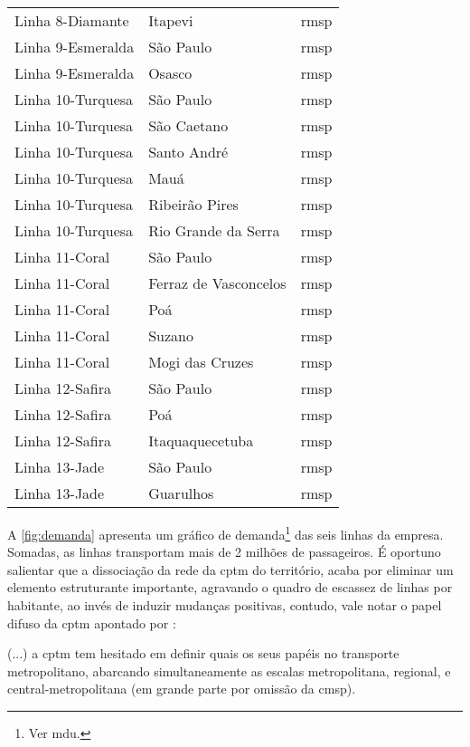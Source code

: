 \documentclass[11pt,fleqn]{book} %
\begin{document}
\begin{center}
\begin{longtable}{|l|l|l|}
		Linha 8-Diamante & Itapevi & \gls{rmsp} \\
		Linha 9-Esmeralda & São Paulo & \gls{rmsp} \\
		Linha 9-Esmeralda & Osasco & \gls{rmsp} \\
		Linha 10-Turquesa & São Paulo & \gls{rmsp} \\
		Linha 10-Turquesa & São Caetano & \gls{rmsp} \\
		Linha 10-Turquesa & Santo André & \gls{rmsp} \\
		Linha 10-Turquesa & Mauá & \gls{rmsp} \\
		Linha 10-Turquesa & Ribeirão Pires & \gls{rmsp} \\
		Linha 10-Turquesa & Rio Grande da Serra & \gls{rmsp} \\
		Linha 11-Coral & São Paulo & \gls{rmsp} \\
		Linha 11-Coral & Ferraz de Vasconcelos & \gls{rmsp} \\
		Linha 11-Coral & Poá & \gls{rmsp} \\
		Linha 11-Coral & Suzano & \gls{rmsp} \\
		Linha 11-Coral & Mogi das Cruzes & \gls{rmsp} \\
		Linha 12-Safira & São Paulo & \gls{rmsp} \\
		Linha 12-Safira & Poá & \gls{rmsp} \\
		Linha 12-Safira & Itaquaquecetuba & \gls{rmsp} \\
		Linha 13-Jade & São Paulo & \gls{rmsp} \\
		Linha 13-Jade & Guarulhos & \gls{rmsp} \\
	\end{longtable}
\end{center}	

A \autoref{fig:demanda} apresenta um gráfico de demanda\footnote{Ver \gls{mdu}.} das seis linhas da empresa. Somadas, as linhas transportam mais de 2 milhões de passageiros. É oportuno salientar que a dissociação da rede da \gls{cptm} do território, acaba por eliminar um elemento estruturante importante, agravando o quadro de escassez de linhas por habitante, ao invés de induzir mudanças positivas, contudo, vale notar o papel difuso da \gls{cptm} apontado por \cite[p. 122]{Isoda}: 

\begin{citacao}
	(...) a \gls{cptm} tem hesitado em definir quais os seus papéis no transporte metropolitano, abarcando simultaneamente as escalas metropolitana, regional, e central-metropolitana (em grande parte por omissão da \gls{cmsp}).
\end{citacao}
\end{document}
